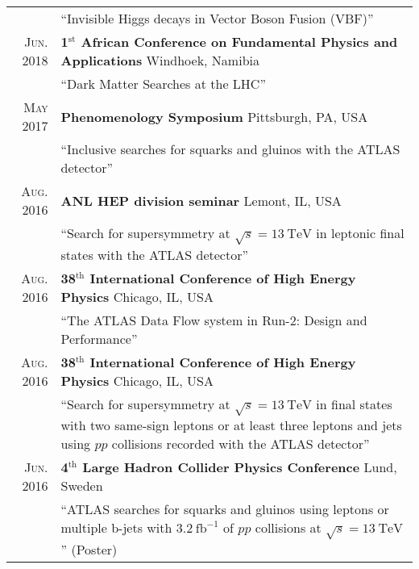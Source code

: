 \documentclass[a4paper,10pt]{article}
\begin{document}
\begin{tabular}{rp{15.5cm}}
						& ``Invisible Higgs decays in Vector Boson Fusion (VBF)''  	\\
\textsc{Jun. 2018}		& {\bf 1$^{\mathrm{st}}$ African Conference on Fundamental Physics and Applications} \hfill Windhoek, Namibia \\
						& ``Dark Matter Searches at the LHC''  	\\
\textsc{May 2017}		& {\bf Phenomenology Symposium} \hfill Pittsburgh, PA, USA \\
						& ``Inclusive searches for squarks and gluinos with the ATLAS detector'' \\
\textsc{Aug. 2016}		& {\bf ANL HEP division seminar} \hfill Lemont, IL, USA \\
						& ``Search for supersymmetry at $\sqrt{s} = 13\ \mathrm{TeV}$ in leptonic final states with the ATLAS detector'' \\
\textsc{Aug. 2016}		& {\bf 38$^{\mathrm{th}}$ International Conference of High Energy Physics} \hfill Chicago, IL, USA \\
						& ``The ATLAS Data Flow system in Run-2: Design and Performance'' \\
\textsc{Aug. 2016}		& {\bf 38$^{\mathrm{th}}$ International Conference of High Energy Physics} \hfill Chicago, IL, USA \\
						& ``Search for supersymmetry at $\sqrt{s} = 13\ \mathrm{TeV}$ in final states with two same-sign leptons or at least three leptons and jets using $pp$ collisions recorded with the ATLAS detector''\\
\textsc{Jun. 2016}		& {\bf 4$^{\mathrm{th}}$ Large Hadron Collider Physics Conference} \hfill Lund, Sweden \\
						& ``ATLAS searches for squarks and gluinos using leptons or multiple b-jets with $3.2\ \mathrm{fb}^{-1}$ of $pp$ collisions at $\sqrt{s} = 13\ \mathrm{TeV}$''  (Poster)\\
\end{tabular}
\end{document}
